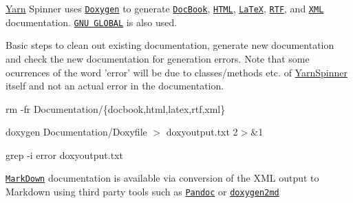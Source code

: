 \hyperlink{a00026}{Yarn} Spinner uses \href{https://www.stack.nl/~dimitri/doxygen}{\tt Doxygen} to generate \href{http://docbook.org/}{\tt Doc\-Book}, \href{https://en.wikipedia.org/wiki/HTML}{\tt H\-T\-M\-L}, \href{https://www.latex-project.org/help/documentation/}{\tt La\-Te\-X}, \href{https://en.wikipedia.org/wiki/Rich_Text_Format}{\tt R\-T\-F}, and \href{https://en.wikipedia.org/wiki/XML}{\tt X\-M\-L} documentation. \href{https://www.gnu.org/software/global/}{\tt G\-N\-U G\-L\-O\-B\-A\-L} is also used.

Basic steps to clean out existing documentation, generate new documentation and check the new documentation for generation errors. Note that some ocurrences of the word 'error' will be due to classes/methods etc. of \hyperlink{a00156}{Yarn\-Spinner} itself and not an actual error in the documentation.


\begin{DoxyItemize}
\item rm -\/fr Documentation/\{docbook,html,latex,rtf,xml\}
\item doxygen Documentation/\-Doxyfile $>$ doxyoutput.\-txt 2$>$\&1
\item grep -\/i error doxyoutput.\-txt
\end{DoxyItemize}

\href{https://daringfireball.net/projects/markdown/}{\tt Mark\-Down} documentation is available via conversion of the X\-M\-L output to Markdown using third party tools such as \href{http://pandoc.org}{\tt Pandoc} or \href{https://github.com/pferdinand/doxygen2md}{\tt doxygen2md} 
